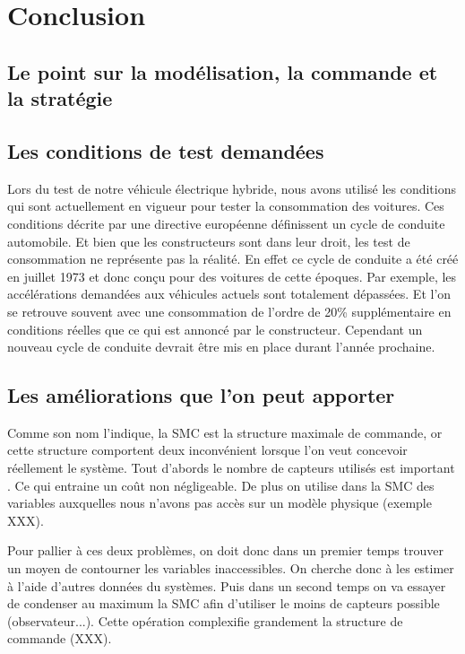 \section{Conclusion}

\subsection{Le point sur la modélisation, la commande et la stratégie}

\subsection{Les conditions de test demandées}

Lors du test de notre véhicule électrique hybride, nous avons utilisé les conditions qui sont actuellement en vigueur pour tester la consommation des voitures. Ces conditions décrite par une directive européenne définissent un cycle de conduite automobile. Et bien que les constructeurs sont dans leur droit, les test de consommation ne représente pas la réalité. En effet ce cycle de conduite a été créé en juillet 1973 et donc conçu pour des voitures de cette époques. Par exemple, les accélérations demandées aux véhicules actuels sont totalement dépassées. Et l'on se retrouve souvent avec une consommation de l'ordre de 20\% supplémentaire en conditions réelles que ce qui est annoncé par le constructeur. Cependant un nouveau cycle de conduite devrait être mis en place durant l'année prochaine. 


\subsection{Les améliorations que l'on peut apporter}

Comme son nom l'indique, la SMC est la structure maximale de commande, or cette structure comportent deux inconvénient lorsque l'on veut concevoir réellement le système. Tout d'abords le nombre de capteurs utilisés est important . Ce qui entraine un coût non négligeable. De plus on utilise dans la SMC des variables auxquelles nous n'avons pas accès sur un modèle physique (exemple XXX). 

Pour pallier à ces deux problèmes, on doit donc dans un premier temps trouver un moyen de contourner les variables inaccessibles. On cherche donc à les estimer à l'aide d'autres données du systèmes. Puis dans un second temps on va essayer de condenser au maximum la SMC afin d'utiliser le moins de capteurs possible (observateur...). Cette opération complexifie grandement la structure de commande (XXX). 





